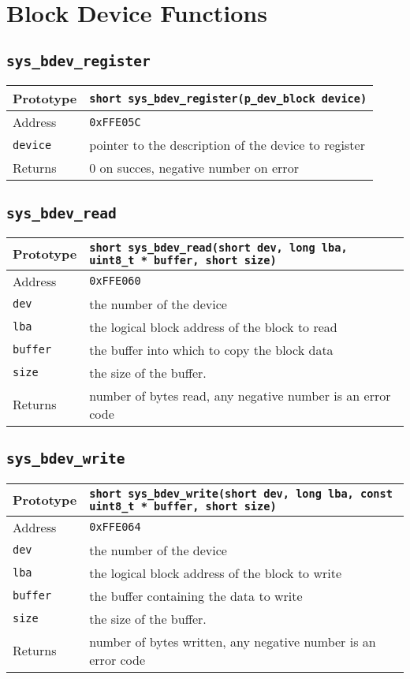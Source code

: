 \section{Block Device Functions}

\subsection*{\texttt{sys\_bdev\_register}}
\begin{tabular}{|l||l|} \hline
Prototype & \lstinline!short sys_bdev_register(p_dev_block device)! \\ \hline
Address & \texttt{0xFFE05C} \\ \hline
\lstinline!device! & pointer to the description of the device to register \\ \hline
Returns & 0 on succes, negative number on error \\ \hline
\end{tabular}

\subsection*{\texttt{sys\_bdev\_read}}
\begin{tabular}{|l||l|} \hline
Prototype & \lstinline!short sys_bdev_read(short dev, long lba, uint8_t * buffer, short size)! \\ \hline
Address & \texttt{0xFFE060} \\ \hline
\lstinline!dev! & the number of the device \\ \hline
\lstinline!lba! & the logical block address of the block to read \\ \hline
\lstinline!buffer! & the buffer into which to copy the block data \\ \hline
\lstinline!size! & the size of the buffer. \\ \hline
Returns & number of bytes read, any negative number is an error code \\ \hline
\end{tabular}

\subsection*{\texttt{sys\_bdev\_write}}
\begin{tabular}{|l||l|} \hline
Prototype & \lstinline!short sys_bdev_write(short dev, long lba, const uint8_t * buffer, short size)! \\ \hline
Address & \texttt{0xFFE064} \\ \hline
\lstinline!dev! & the number of the device \\ \hline
\lstinline!lba! & the logical block address of the block to write \\ \hline
\lstinline!buffer! & the buffer containing the data to write \\ \hline
\lstinline!size! & the size of the buffer. \\ \hline
Returns & number of bytes written, any negative number is an error code \\ \hline
\end{tabular}

